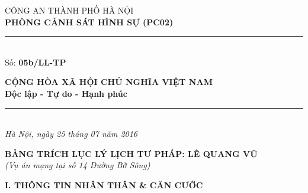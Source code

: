 \documentclass[12pt,a4paper]{article}
\begin{document}
\noindent
\begin{minipage}[t]{0.46\textwidth}
    \begin{center}
        \fontsize{11pt}{13pt}\selectfont
        CÔNG AN THÀNH PHỐ HÀ NỘI\\
        \textbf{PHÒNG CẢNH SÁT HÌNH SỰ (PC02)}\\[-0.2em]
        \rule{3.2cm}{0.6pt}\\[0.25cm]
        \fontsize{11pt}{13pt}\selectfont Số: \textbf{05b/LL-TP}
    \end{center}
\end{minipage}
\hfill
\begin{minipage}[t]{0.52\textwidth}
    \begin{center}
        \fontsize{11pt}{13pt}\selectfont
        \textbf{CỘNG HÒA XÃ HỘI CHỦ NGHĨA VIỆT NAM}\\
        \textbf{Độc lập - Tự do - Hạnh phúc}\\[-0.2em]
        \rule{3.6cm}{0.6pt}\\[0.25cm]
        \textit{Hà Nội, ngày 25 tháng 07 năm 2016}
    \end{center}
\end{minipage}

\vspace{0.5cm}

\begin{center}
    \textbf{\Large BẢNG TRÍCH LỤC LÝ LỊCH TƯ PHÁP: LÊ QUANG VŨ}\\[0.15cm]
    \textit{(Vụ án mạng tại số 14 Đường Bờ Sông)}
\end{center}

\vspace{0.3cm}



\vspace{0.3cm}\noindent\textbf{\large I. THÔNG TIN NHÂN THÂN \& CĂN CƯỚC}\\[0.15cm]
\end{document}
